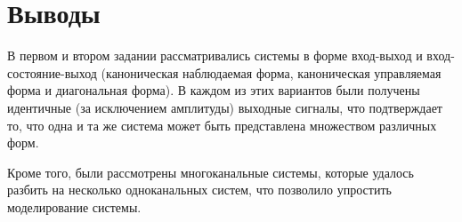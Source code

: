 
\FloatBarrier{}


\FloatBarrier{}


\FloatBarrier{}

\section{Выводы}
В первом и втором задании рассматривались системы в форме вход-выход и вход-состояние-выход 
(каноническая наблюдаемая форма, каноническая управляемая форма и диагональная форма). 
В каждом из этих вариантов были получены идентичные (за исключением амплитуды) выходные сигналы,
что подтверждает то, что одна и та же система может быть представлена множеством различных форм. 

Кроме того, были рассмотрены многоканальные системы, которые удалось разбить на несколько 
одноканальных систем, что позволило упростить моделирование системы. 